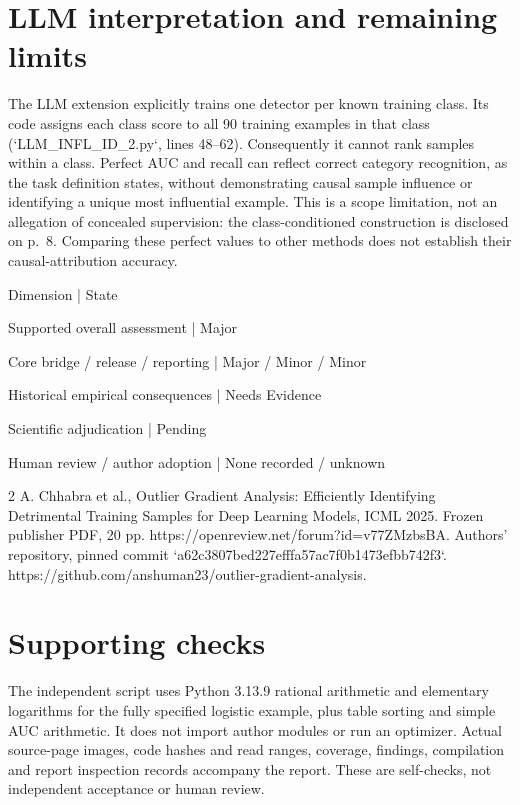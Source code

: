 \documentclass[10pt]{article}
\begin{document}
\section*{LLM interpretation and remaining limits}
The LLM extension explicitly trains one detector per known training class. Its code assigns each class score to all 90 training examples in that class (`LLM\_INFL\_ID\_2.py`, lines 48–62). Consequently it cannot rank samples within a class. Perfect AUC and recall can reflect correct category recognition, as the task definition states, without demonstrating causal sample influence or identifying a unique most influential example. This is a scope limitation, not an allegation of concealed supervision: the class-conditioned construction is disclosed on p. 8. Comparing these perfect values to other methods does not establish their causal-attribution accuracy.\par
Dimension | State\par
Supported overall assessment | Major\par
Core bridge / release / reporting | Major / Minor / Minor\par
Historical empirical consequences | Needs Evidence\par
Scientific adjudication | Pending\par
Human review / author adoption | None recorded / unknown\par
2 A. Chhabra et al., Outlier Gradient Analysis: Efficiently Identifying Detrimental Training Samples for Deep Learning Models, ICML 2025. Frozen publisher PDF, 20 pp. https://openreview.net/forum?id=v77ZMzbsBA. Authors’ repository, pinned commit `a62c3807bed227efffa57ac7f0b1473efbb742f3`. https://github.com/anshuman23/outlier-gradient-analysis.\par
\section*{Supporting checks}
The independent script uses Python 3.13.9 rational arithmetic and elementary logarithms for the fully specified logistic example, plus table sorting and simple AUC arithmetic. It does not import author modules or run an optimizer. Actual source-page images, code hashes and read ranges, coverage, findings, compilation and report inspection records accompany the report. These are self-checks, not independent acceptance or human review.\par
\end{document}
